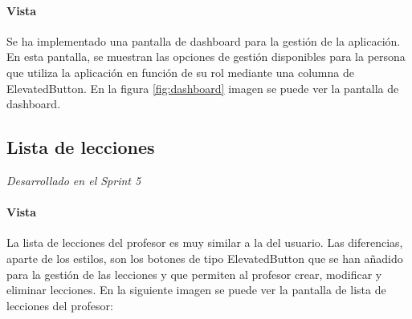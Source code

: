 \paragraph*{Vista}
Se ha implementado una pantalla de dashboard para la gestión de la aplicación.
En esta pantalla, se muestran las opciones de gestión disponibles para la persona que utiliza la aplicación en función de su rol mediante una columna de ElevatedButton.
 En la figura \ref*{fig:dashboard} imagen se puede ver la pantalla de dashboard.




\subsection{Lista de lecciones} 
\textit{Desarrollado en el Sprint 5}

\paragraph*{Vista}
La lista de lecciones del profesor es muy similar a la del usuario. Las diferencias, aparte de los estilos, son los botones de tipo ElevatedButton
 que se han añadido para la gestión de las lecciones y que permiten al profesor crear, modificar y eliminar lecciones.
  En la siguiente imagen se puede ver la pantalla de lista de lecciones del profesor:

